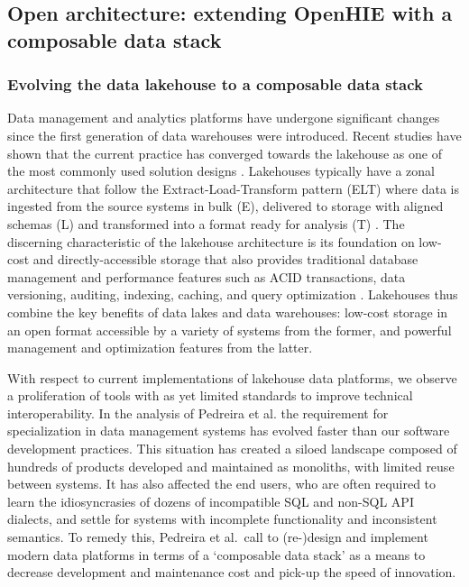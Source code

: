 \documentclass[
  authoryear]{elsarticle}
\begin{document}
\subsection{Open architecture: extending OpenHIE with a composable data
stack}\label{open-architecture-extending-openhie-with-a-composable-data-stack}

\subsubsection{Evolving the data lakehouse to a composable data
stack}\label{evolving-the-data-lakehouse-to-a-composable-data-stack}

Data management and analytics platforms have undergone significant
changes since the first generation of data warehouses were introduced.
Recent studies have shown that the current practice has converged
towards the lakehouse as one of the most commonly used solution designs
\citep{armbrust2021lakehouse, hai2023data, harby2022data}. Lakehouses
typically have a zonal architecture that follow the
Extract-Load-Transform pattern (ELT) where data is ingested from the
source systems in bulk (E), delivered to storage with aligned schemas
(L) and transformed into a format ready for analysis (T)
\citep{hai2023data}. The discerning characteristic of the lakehouse
architecture is its foundation on low-cost and directly-accessible
storage that also provides traditional database management and
performance features such as ACID transactions, data versioning,
auditing, indexing, caching, and query optimization
\citep{armbrust2021lakehouse}. Lakehouses thus combine the key benefits
of data lakes and data warehouses: low-cost storage in an open format
accessible by a variety of systems from the former, and powerful
management and optimization features from the latter.

With respect to current implementations of lakehouse data platforms, we
observe a proliferation of tools with as yet limited standards to
improve technical interoperability. In the analysis of Pedreira et al.
\citep{pedreira2023composable} the requirement for specialization in
data management systems has evolved faster than our software development
practices. This situation has created a siloed landscape composed of
hundreds of products developed and maintained as monoliths, with limited
reuse between systems. It has also affected the end users, who are often
required to learn the idiosyncrasies of dozens of incompatible SQL and
non-SQL API dialects, and settle for systems with incomplete
functionality and inconsistent semantics. To remedy this, Pedreira et
al.~call to (re-)design and implement modern data platforms in terms of
a `composable data stack' as a means to decrease development and
maintenance cost and pick-up the speed of innovation.
\end{document}
